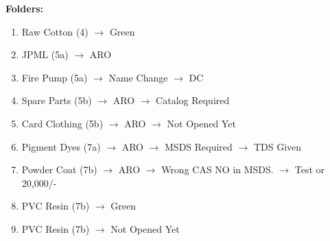 \documentclass[12pt]{article}
\begin{document}
\noindent
\textbf{Folders:}
\begin{enumerate}
\item
    Raw Cotton (4)
$\rightarrow$
Green

\item
    JPML (5a)
$\rightarrow$
ARO

\item
    Fire Pump (5a)
$\rightarrow$
Name Change
$\rightarrow$
DC

\item
    Spare Parts (5b)
$\rightarrow$
ARO
$\rightarrow$
Catalog Required

\item
    Card Clothing (5b)
$\rightarrow$
ARO
$\rightarrow$
Not Opened Yet

\item
    Pigment Dyes (7a)
$\rightarrow$
ARO
$\rightarrow$
MSDS Required
$\rightarrow$
TDS Given

\item
    Powder Coat (7b)
$\rightarrow$
ARO
$\rightarrow$
Wrong CAS NO in MSDS.
$\rightarrow$
Test or 20,000/-

\item
    PVC Resin (7b)
$\rightarrow$
Green

\item
PVC Resin (7b)
$\rightarrow$
Not Opened Yet



\end{enumerate}
\end{document}
